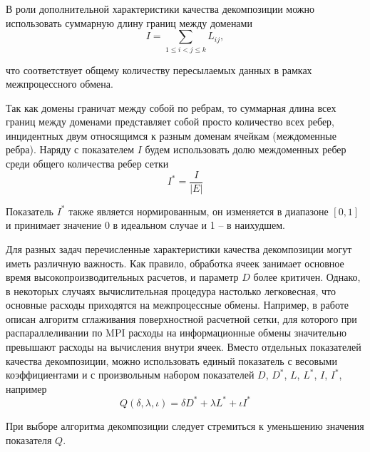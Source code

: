 В роли дополнительной характеристики качества декомпозиции можно использовать суммарную длину границ между доменами
\begin{equation}
	I = \sum_{1 \le i < j \le k}{L_{ij}},
\end{equation}

что соответствует общему количеству пересылаемых данных в рамках межпроцессного обмена.

Так как домены граничат между собой по ребрам, то суммарная длина всех границ между доменами представляет собой просто количество всех ребер, инцидентных двум относящимся к разным доменам ячейкам (междоменные ребра).
Наряду с показателем $I$ будем использовать долю междоменных ребер среди общего количества ребер сетки
\begin{equation}
	I^{*} = \frac{I}{|E|}
\end{equation}

Показатель $I^{*}$ также является нормированным, он изменяется в диапазоне $[0, 1]$ и принимает значение 0 в идеальном случае и 1 -- в наихудшем.

Для разных задач перечисленные характеристики качества декомпозиции могут иметь различную важность.
Как правило, обработка ячеек занимает основное время высокопроизводительных расчетов, и параметр $D$ более критичен.
Однако, в некоторых случаях вычислительная процедура настолько легковесная, что основные расходы приходятся на межпроцессные обмены.
Например, в работе \cite{Tong2017Remesh} описан алгоритм сглаживания поверхностной расчетной сетки, для которого при распараллеливании по MPI расходы на информационные обмены значительно превышают расходы на вычисления внутри ячеек.
Вместо отдельных показателей качества декомпозиции, можно использовать единый показатель с весовыми коэффициентами и с произвольным набором показателей $D$, $D^{*}$, $L$, $L^{*}$, $I$, $I^{*}$, например
\begin{equation}
	Q(\delta, \lambda, \iota) = \delta D^{*} + \lambda L^{*} + \iota I^{*}
\end{equation}

При выборе алгоритма декомпозиции следует стремиться к уменьшению значения показателя $Q$.
